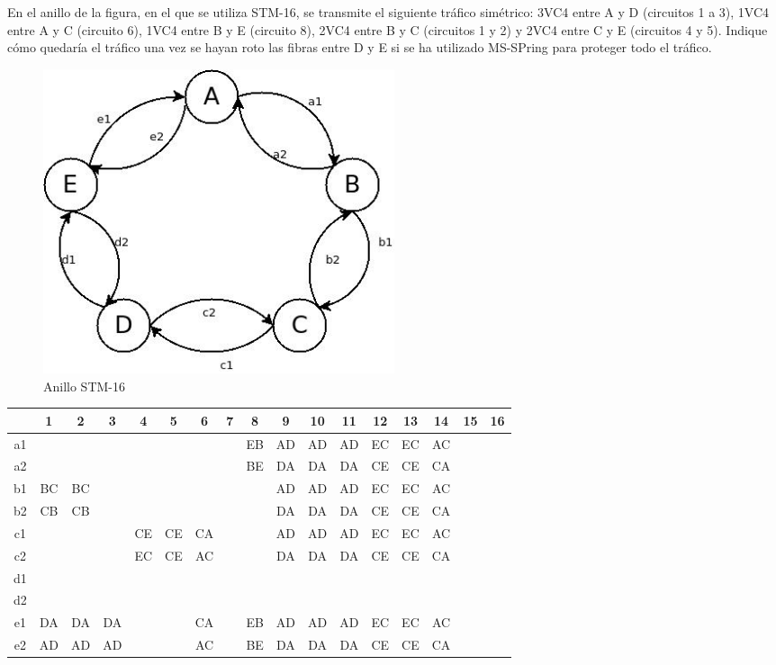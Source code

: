\begin{exercise}[5]
	En el anillo de la figura, en el que se utiliza STM-16, se transmite el siguiente tráfico simétrico: 3VC4 entre A y D (circuitos 1 a 3), 1VC4 entre A y C (circuito 6), 1VC4 entre B y E (circuito 8), 2VC4 entre B y C (circuitos 1 y 2) y 2VC4 entre C y E (circuitos 4 y 5). Indique cómo quedaría el tráfico una vez se hayan roto las fibras entre D y E si se ha utilizado MS-SPring para proteger todo el tráfico.
	\begin{figure}[H]
	\centering
	\includegraphics[width=0.5\textwidth]{Imagen/ejercicio5tema3.jpg}
	\caption{Anillo STM-16}
	\end{figure}
	\begin{tabular}{c|c|c|c|c|c|c|c|c|c|c|c|c|c|c|c|c|}
		   & 1  & 2  & 3  & 4  & 5  & 6  & 7  & 8  & 9  & 10 & 11 & 12 & 13 & 14 & 15 & 16 \\\hline
		a1 &    &    &    &    &    &    &    & EB & AD & AD & AD & EC & EC & AC &    &    \\\hline
		a2 &    &    &    &    &    &    &    & BE & DA & DA & DA & CE & CE & CA &    &    \\\hline
		b1 & BC & BC &    &    &    &    &    &    & AD & AD & AD & EC & EC & AC &    &    \\\hline
		b2 & CB & CB &    &    &    &    &    &    & DA & DA & DA & CE & CE & CA &    &    \\\hline
		c1 &    &    &    & CE & CE & CA &    &    & AD & AD & AD & EC & EC & AC &    &    \\\hline
		c2 &    &    &    & EC & CE & AC &    &    & DA & DA & DA & CE & CE & CA &    &    \\\hline
		d1 &    &    &    &    &    &    &    &    &    &    &    &    &    &    &    &    \\\hline
		d2 &    &    &    &    &    &    &    &    &    &    &    &    &    &    &    &    \\\hline
		e1 & DA & DA & DA &    &    & CA &    & EB & AD & AD & AD & EC & EC & AC &    &    \\\hline
		e2 & AD & AD & AD &    &    & AC &    & BE & DA & DA & DA & CE & CE & CA &    &    \\\hline
	\end{tabular}
\end{exercise}
